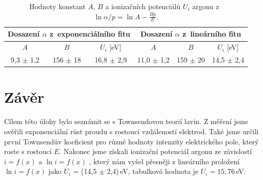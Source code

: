 \documentclass[a4paper,12pt]{article}
\begin{document}
\begin{center}
	\begin{table}[h]
		\centering
		\caption{Hodnoty konstant $A$, $B$ a ionizačních potenciálů $U_i$ 
		argonu z~$\ln \alpha/p = \ln A - \frac{Bp}{E}$.}
		\label{tab2}
		\begin{tabular}{|c|c|c|c|c|c|} \hline
			\multicolumn{3}{|c|}{Dosazení $\alpha$ z~exponenciálního fitu} & \multicolumn{3}{c|}{Dosazení $\alpha$ z~lineárního fitu}  \\ \hline
			$A$ & $B$ & $U_i$ [eV] & $A$ & $B$ & $U_i$ [eV] \\ \hline
			9,3 $\pm$ 1,2 & 156 $\pm$ 18 &  16,8 $\pm$ 2,9  & 11,0 $\pm$ 1,2 & 
			159 $\pm$ 20 & 14,5 $\pm$ 2,4\\ \hline
		\end{tabular}
	\end{table}
\end{center}

\newpage
\section{Závěr}
Cílem této úlohy bylo seznámit se s Townsendovou teorií lavin. Z měření jsme 
ověřili exponenciální růst proudu s rostoucí vzdáleností elektrod. Také jsme 
určili první Townsendův koeficient pro různé hodnoty intenzity elektrického 
pole, který roste s rostoucí $E$. Nakonec jsme získali ionizační potenciál 
argonu ze závislostí $i = f(x)$ a $\ln i = f(x)$ , který nám vyšel přesněji z 
lineárního proložení $\ln i = f(x)$ jako $U_i$ = (14,5 $\pm$  2,4)\,eV, 
tabulková hodnota je $U_i = 15,76$\,eV.
\end{document}
